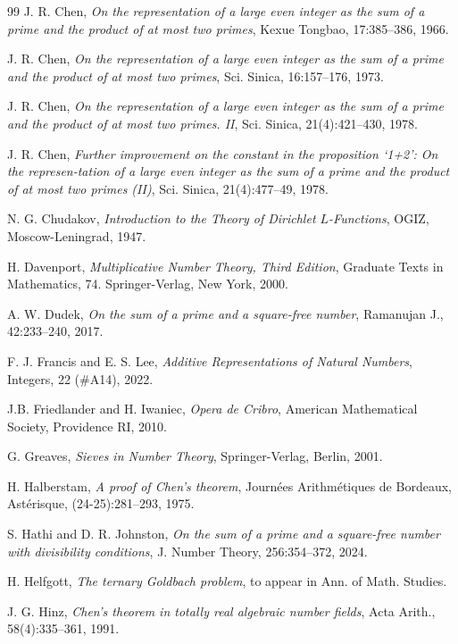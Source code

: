 \documentclass[12pt]{amsart}
\begin{document}
\begin{thebibliography}{99}
J. R. Chen,
\textit{On the representation of a large even integer as the sum of a prime and the product of at most two primes},
Kexue Tongbao, 17:385--386, 1966.

J. R. Chen,
\textit{On the representation of a large even integer as the sum of a prime and the product of at most two primes},
Sci. Sinica, 16:157--176, 1973.

J. R. Chen,
\textit{On the representation of a large even integer as the sum of a
              prime and the product of at most two primes. {II}},
Sci. Sinica, 21(4):421--430, 1978.

J. R. Chen,
\textit{Further improvement on the constant in the proposition ‘1+2’: On the represen-tation of a large even integer as the sum of a prime and the product of at most two primes (II)},
Sci. Sinica, 21(4):477--49, 1978.

N. G. Chudakov,
\textit{Introduction to the Theory of Dirichlet $L$-Functions},
OGIZ, Moscow-Leningrad, 1947. 



H. Davenport,
\textit{Multiplicative Number Theory, Third Edition},
Graduate Texts in Mathematics, 74. Springer-Verlag, New York, 2000.

A. W. Dudek, 
\textit{On the sum of a prime and a square-free number},
Ramanujan J., 42:233--240, 2017.

F. J. Francis and E. S. Lee,
\textit{Additive Representations of Natural Numbers},
Integers, 22 (\#A14), 2022.

J.B. Friedlander and H. Iwaniec,
\textit{Opera de Cribro},
American Mathematical Society, Providence RI,  2010.

G. Greaves, 
\textit{Sieves in Number Theory},
Springer-Verlag, Berlin, 2001.

H. Halberstam,
\textit{A proof of Chen's theorem},
Journées Arithmétiques de Bordeaux, Astérisque, (24-25):281--293, 1975.

S. Hathi and D. R. Johnston, 
\textit{On the sum of a prime and a square-free number with divisibility conditions},
J. Number Theory, 256:354--372, 2024.

H. Helfgott,
\textit{The ternary Goldbach problem},
to appear in Ann. of Math. Studies.

J. G. Hinz, 
\textit{Chen's theorem in totally real algebraic number fields},
Acta Arith., 58(4):335--361, 1991. 


\end{thebibliography}
\end{document}
